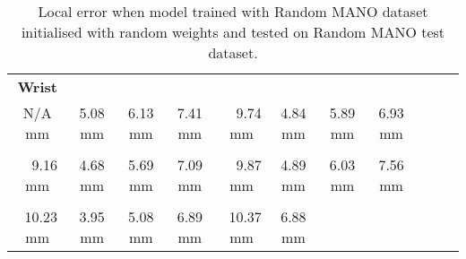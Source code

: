     \begin{table}[!ht]
    \begin{tabular}{|c|c|c|c|c|c|c|c|c|c|c|}
    \hline
    {\bfseries Wrist} & \cellcolor[HTML]{00ff00}{\bfseries IMCP} & \cellcolor[HTML]{00ff00}{\bfseries IPIP} & \cellcolor[HTML]{00ff00}{\bfseries IDIP} & \cellcolor[HTML]{00ff00}{\bfseries ITIP} & \cellcolor[HTML]{00ff00}{\bfseries MMCP} & \cellcolor[HTML]{00ff00}{\bfseries MPIP} & \cellcolor[HTML]{00ff00}{\bfseries MDIP}  \\
    N/A mm & \cellcolor[HTML]{00ff00}$\,\,\,\,\,\,$5.08 mm & \cellcolor[HTML]{00ff00}$\,\,\,\,\,\,$6.13 mm & \cellcolor[HTML]{00ff00}$\,\,\,\,\,\,$7.41 mm & \cellcolor[HTML]{00ff00}$\,\,\,\,\,\,$9.74 mm & \cellcolor[HTML]{00ff00}$\,\,\,\,\,\,$4.84 mm & \cellcolor[HTML]{00ff00}$\,\,\,\,\,\,$5.89 mm & \cellcolor[HTML]{00ff00}$\,\,\,\,\,\,$6.93 mm\\
    \hline
    \cellcolor[HTML]{00ff00}{\bfseries MTIP} & \cellcolor[HTML]{00ff00}{\bfseries RMCP} & \cellcolor[HTML]{00ff00}{\bfseries RPIP} & \cellcolor[HTML]{00ff00}{\bfseries RDIP} & \cellcolor[HTML]{00ff00}{\bfseries RTIP} & \cellcolor[HTML]{00ff00}{\bfseries PMCP} & \cellcolor[HTML]{00ff00}{\bfseries PPIP} & \cellcolor[HTML]{00ff00}{\bfseries PDIP}  \\
    \cellcolor[HTML]{00ff00}$\,\,\,\,\,\,$9.16 mm & \cellcolor[HTML]{00ff00}$\,\,\,\,\,\,$4.68 mm & \cellcolor[HTML]{00ff00}$\,\,\,\,\,\,$5.69 mm & \cellcolor[HTML]{00ff00}$\,\,\,\,\,\,$7.09 mm & \cellcolor[HTML]{00ff00}$\,\,\,\,\,\,$9.87 mm & \cellcolor[HTML]{00ff00}$\,\,\,\,\,\,$4.89 mm & \cellcolor[HTML]{00ff00}$\,\,\,\,\,\,$6.03 mm & \cellcolor[HTML]{00ff00}$\,\,\,\,\,\,$7.56 mm\\
    \hline
    \cellcolor[HTML]{40ff00}{\bfseries PTIP} & \cellcolor[HTML]{00ff00}{\bfseries TMCP} & \cellcolor[HTML]{00ff00}{\bfseries TPIP} & \cellcolor[HTML]{00ff00}{\bfseries PDIP} & \cellcolor[HTML]{40ff00}{\bfseries TTIP} & \cellcolor[HTML]{00ff00}{\bfseries Average}  \\
    \cellcolor[HTML]{40ff00}$\,\,\,$10.23 mm & \cellcolor[HTML]{00ff00}$\,\,\,\,\,\,$3.95 mm & \cellcolor[HTML]{00ff00}$\,\,\,\,\,\,$5.08 mm & \cellcolor[HTML]{00ff00}$\,\,\,\,\,\,$6.89 mm & \cellcolor[HTML]{40ff00}$\,\,\,$10.37 mm & \cellcolor[HTML]{00ff00}$\,\,\,\,\,\,$6.88 mm \\
    \cline{1-6}
    \end{tabular}
    \caption{Local error when model trained with Random MANO dataset initialised with random weights and tested on Random MANO test dataset.}
    \label{tb:orol}
    \end{table}